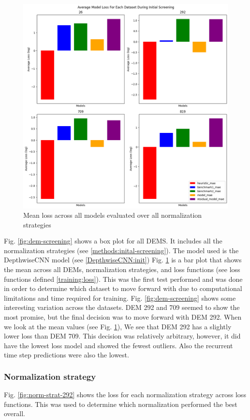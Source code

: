 \begin{figure}[htbp]
	\centering
	\includegraphics[width=0.9\linewidth, height=0.7\linewidth]{"Figures/Results/Initial screening/DEM screening plots/Data_Set_Dem_Screening_Log"}
	\caption[Mean Loss Across DEMs]{Mean loss across all models evaluated over all normalization strategies}
	\label{fig:mean-dem-screening}
\end{figure}

Fig. \ref{fig:dem-screening} shows a box plot for all DEMS. It includes all the normalization strategies (see \ref{methods:inital-screening}). The model used is the DepthwiseCNN model (see \ref{DepthwiseCNN:init}) Fig. \ref{fig:mean-dem-screening} is a bar plot that shows the mean across all DEMs, normalization strategies, and loss functions (see loss functions defined \ref{training:loss}). This was the first test performed and was done in order to determine which dataset to move forward with due to computational limitations and time required for training. Fig. \ref{fig:dem-screening} shows some interesting variation across the datasets. DEM 292 and 709 seemed to show the most promise, but the final decision was to move forward with DEM 292. When we look at the mean values (see Fig. \ref{fig:mean-dem-screening}), We see that DEM 292 has a slightly lower loss than DEM 709. This decision was relatively arbitrary, however, it did have the lowest loss model and showed the fewest outliers. Also the recurrent time step predictions were also the lowest.

\subsubsection*{Normalization strategy}
Fig. \ref{fig:norm-strat-292} shows the loss for each normalization strategy across loss functions. This was used to determine which normalization performed the best overall.

